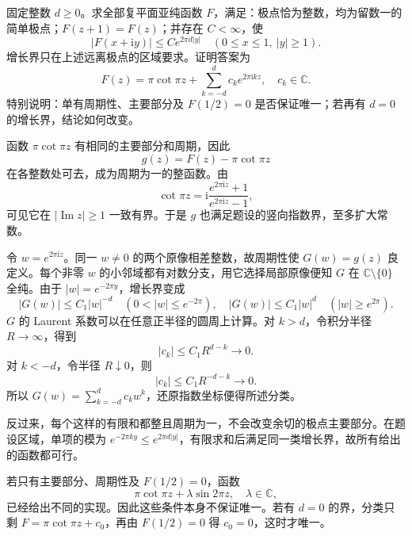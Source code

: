 \begin{exercise}[周期主要部分与增长自由度]\label{b3:ex:20-draft-04}
固定整数 \(d\ge0\)。求全部复平面亚纯函数 \(F\)，满足：极点恰为整数，均为留数一的简单极点；\(F(z+1)=F(z)\)；并存在 \(C<\infty\)，使
\[
 |F(x+\mathrm iy)|\le Ce^{2\pi d|y|}
 \quad(0\le x\le1,\ |y|\ge1).
\]
增长界只在上述远离极点的区域要求。证明答案为
\[
 F(z)=\pi\cot\pi z+\sum_{k=-d}^dc_ke^{2\pi\mathrm i kz},
 \quad c_k\in\mathbb C.
\]
特别说明：单有周期性、主要部分及 \(F(1/2)=0\) 是否保证唯一；若再有 \(d=0\) 的增长界，结论如何改变。
\end{exercise}
\begin{solution}
函数 \(\pi\cot\pi z\) 有相同的主要部分和周期，因此
\[
 g(z)=F(z)-\pi\cot\pi z
\]
在各整数处可去，成为周期为一的整函数。由
\[
 \cot\pi z=\mathrm i\frac{e^{2\pi\mathrm iz}+1}{e^{2\pi\mathrm iz}-1},
\]
可见它在 \(|\operatorname{Im}z|\ge1\) 一致有界。于是 \(g\) 也满足题设的竖向指数界，至多扩大常数。

令 \(w=e^{2\pi\mathrm iz}\)。同一 \(w\ne0\) 的两个原像相差整数，故周期性使
\(G(w)=g(z)\) 良定义。每个非零 \(w\) 的小邻域都有对数分支，用它选择局部原像便知 \(G\) 在 \(\mathbb C\setminus\{0\}\) 全纯。由于 \(|w|=e^{-2\pi y}\)，增长界变成
\[
 |G(w)|\le C_1|w|^{-d}\quad(0<|w|\le e^{-2\pi}),\quad
 |G(w)|\le C_1|w|^d\quad(|w|\ge e^{2\pi}).
\]
\(G\) 的 Laurent 系数可以在任意正半径的圆周上计算。对 \(k>d\)，令积分半径 \(R\to\infty\)，得到
\[
 |c_k|\le C_1R^{d-k}\longrightarrow0.
\]
对 \(k<-d\)，令半径 \(R\downarrow0\)，则
\[
 |c_k|\le C_1R^{-d-k}\longrightarrow0.
\]
所以 \(G(w)=\sum_{k=-d}^dc_kw^k\)，还原指数坐标便得所述分类。

反过来，每个这样的有限和都整且周期为一，不会改变余切的极点主要部分。在题设区域，单项的模为 \(e^{-2\pi ky}\le e^{2\pi d|y|}\)，有限求和后满足同一类增长界，故所有给出的函数都可行。

若只有主要部分、周期性及 \(F(1/2)=0\)，函数
\[
 \pi\cot\pi z+\lambda\sin2\pi z,\quad\lambda\in\mathbb C,
\]
已经给出不同的实现。因此这些条件本身不保证唯一。若有 \(d=0\) 的界，分类只剩 \(F=\pi\cot\pi z+c_0\)，再由 \(F(1/2)=0\) 得 \(c_0=0\)，这时才唯一。
\end{solution}

